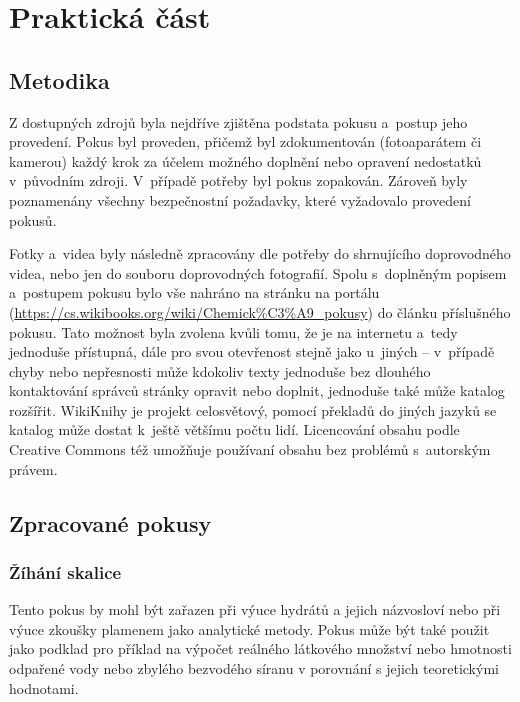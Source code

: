 \chapter{Praktická část}

\section{Metodika}
Z dostupných zdrojů byla nejdříve zjištěna podstata pokusu a~postup jeho provedení. Pokus byl proveden, přičemž byl zdokumentován (fotoaparátem či kamerou) každý krok za účelem možného doplnění nebo opravení nedostatků v~původním zdroji. V~případě potřeby byl pokus zopakován. Zároveň byly poznamenány všechny bezpečnostní požadavky, které vyžadovalo provedení pokusů.

Fotky a~videa byly následně zpracovány dle potřeby do shrnujícího doprovodného videa, nebo jen do souboru doprovodných fotografií. Spolu s~doplněným popisem a~postupem pokusu bylo vše nahráno na stránku  na portálu  (\url{https://cs.wikibooks.org/wiki/Chemick%C3%A9_pokusy}) do článku příslušného pokusu. Tato možnost byla zvolena kvůli tomu, že je na internetu a~tedy jednoduše přístupná, dále pro svou otevřenost stejně jako u~jiných \uv{wiki projektů} -- v~případě chyby nebo nepřesnosti může kdokoliv texty jednoduše bez dlouhého kontaktování správců stránky opravit nebo doplnit, jednoduše také může katalog rozšířit. WikiKnihy je projekt celosvětový, pomocí překladů do jiných jazyků se katalog může dostat k~ještě většímu počtu lidí. Licencování obsahu podle Creative Commons též umožňuje používaní obsahu bez problémů s~autorským právem.

\section{Zpracované pokusy}
\subsection{Žíhání skalice}


Tento pokus by mohl být zařazen při výuce hydrátů a jejich názvosloví nebo při výuce zkoušky plamenem jako analytické metody. Pokus může být také použit jako podklad pro příklad na výpočet reálného látkového množství nebo hmotnosti odpařené vody nebo zbylého bezvodého síranu v porovnání s jejich teoretickými hodnotami.\\


